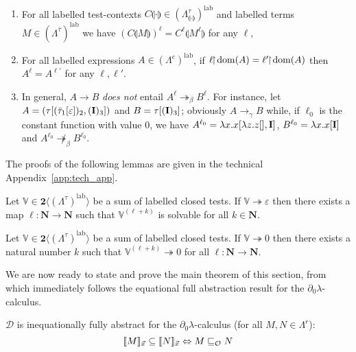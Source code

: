 \documentclass{LMCS}
\newcommand{\restr}{\hspace{-4pt}\upharpoonright}\newcommand{\dom}{\mathrm{dom}}
\newcommand{\nat}{\mathbf{N}}
\newcommand{\bool}{\mathbf{2}}
\newcommand{\dzlam}{\ensuremath{\partial_0\lambda}}
\newcommand{\lam}{\ensuremath{\lambda}}
\renewcommand{\hole}[1]{\llparenthesis #1\rrparenthesis}
\newcommand{\Set}[1]{\Lambda^{#1}}
\newcommand{\ContSet}{\Set{\gt}_{\hole{\cdot}}}
\newcommand{\msto}{\twoheadrightarrow}
\newcommand{\Int}[1]{\llbracket #1\rrbracket} \newcommand{\trm}[1]{#1^{\textrm{--}}}
\renewcommand{\iff}{\Leftrightarrow}
\newcommand{\seq}[1]{\vec{#1}}
\newcommand{\sV}{\mathbb{V}}
\newcommand{\gb}{\beta}
\newcommand{\gt}{\ensuremath{\tau}}
\newcommand{\gto}{\ensuremath{\bar\tau}}
\newcommand\lab{\mathrm{lab}}
\newcommand{\cD}{\mathcal{D}}
\begin{document}
\begin{rem}\label{rem:eq-dom-entails-eq} \
\begin{enumerate}[1.]
\item\label{rem:eq-dom-entails-eq1} 
	For all labelled test-contexts $C\hole{\cdot}\in(\ContSet)^\lab$ and labelled terms $M\in(\Set{\gto})^\lab$ we have $(C\hole{M})^\ell = C^\ell\hole{M^\ell}$ for any $\ell$,
\item\label{rem:eq-dom-entails-eq2} 
	For all labelled expressions $A\in(\Set{e})^\lab$, if $\ell\restr\!\dom{(A)} = \ell'\restr\! \dom{(A)}$ then $A^\ell = A^{\ell'}$ for any $\ell,\ell'$.
\item\label{rem:eq-dom-entails-eq3} 
	In general, $A\to B$ \emph{does not} entail $A^\ell\msto_\gb B^\ell$. 
	For instance, let $A = (\gt[(\gto_1[\varepsilon])_2,(\bold{I})_3])$ and $B=\gt[(\bold{I})_3]$; 
	obviously $A\to_\gamma B$ while, if $\ell_0$ is the constant function with value $0$, we have 
	$A^{\ell_0} = \lam x.x[\lam z.z[],\bold{I}]$, $ B^{\ell_0} = \lam x.x[\bold{I}]$ and $A^{\ell_0}\not\msto_\gb B^{\ell_0}$.
\end{enumerate}
\end{rem}

The proofs of the following lemmas are given in the technical Appendix~\ref{app:tech_app}.

\begin{lem}\label{lemma:exists-forall} 
Let $\sV\in\bool\langle(\Set{\gt})^\lab\rangle$ be a sum of labelled closed tests. 
If $\sV\msto\varepsilon$ then there exists a map $\ell:\nat\to\nat$ such that $\sV^{(\ell+k)}$ is solvable for all $k\in\nat$.
\end{lem}

\begin{lem}\label{lemma:forall-exists} 
Let $\sV\in\bool\langle(\Set{\gt})^\lab\rangle$ be a sum of labelled closed tests. 
If $\sV\msto 0$ then there exists a natural number $k$ such that $\sV^{(\ell+k)}\msto 0$ for all $\ell:\nat\to\nat$.
\end{lem}

We are now ready to state and prove the main theorem of this section, from which immediately follows the equational full abstraction result for the
 $\dzlam$-calculus.

\begin{thm}\label{thm:main1-1}
$\cD$ is inequationally fully abstract for the \dzlam-calculus (for all $M,N\in\Set{r}$):
$$
\Int{M}_{\seq x}\subseteq \Int{N}_{\seq x} \iff M\obsle N
$$
\end{thm}
\end{document}
